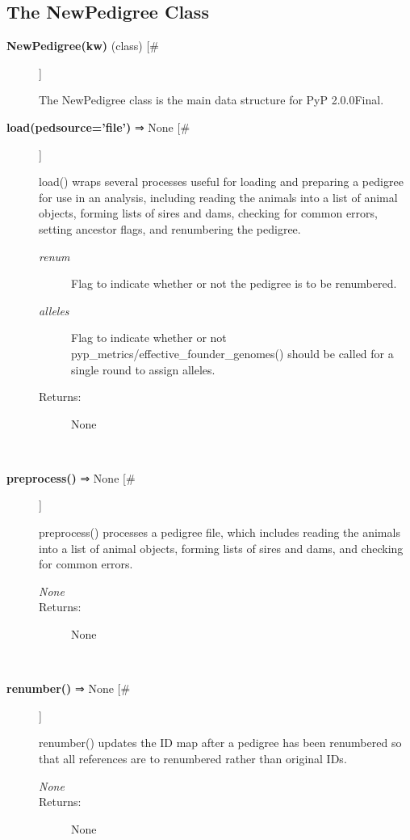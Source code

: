 \subsection*{The NewPedigree Class}
\begin{description}
\item[\textbf{NewPedigree(kw)}
 (class) [\#]]

 The NewPedigree class is the main data structure for PyP 2.0.0Final.

\item[\textbf{load(pedsource='file')}
 ⇒ None [\#]]

 load() wraps several processes useful for loading and preparing a pedigree for use in an analysis, including reading the animals into a list of animal objects, forming lists of sires and dams, checking for common errors, setting ancestor flags, and renumbering the pedigree.
\begin{description}
\item[\emph{renum}
] Flag to indicate whether or not the pedigree is to be renumbered.
\item[\emph{alleles}
] Flag to indicate whether or not pyp\_metrics/effective\_founder\_genomes() should be called for a single round to assign alleles.
\item[Returns:] None

\end{description}
\\ 

\item[\textbf{preprocess()}
 ⇒ None [\#]]

 preprocess() processes a pedigree file, which includes reading the animals into a list of animal objects, forming lists of sires and dams, and checking for common errors.
\begin{description}
\item[\emph{None}
]
\item[Returns:] None

\end{description}
\\ 

\item[\textbf{renumber()}
 ⇒ None [\#]]

 renumber() updates the ID map after a pedigree has been renumbered so that all references are to renumbered rather than original IDs.
\begin{description}
\item[\emph{None}
]
\item[Returns:] None


\end{description}
\end{description}
